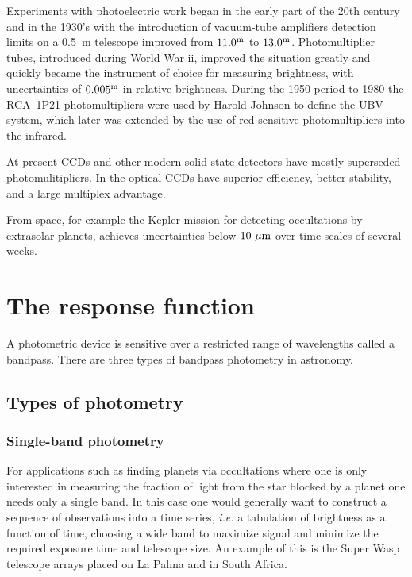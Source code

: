 Experiments with photoelectric work began in the early part of the
20th century and in the 1930's with the introduction of vacuum-tube
amplifiers detection limits on a 0.5~m telescope improved from
$11.0^{\rm m}$ to $13.0^{\rm m}$. Photomultiplier tubes, introduced
during World War {\sc ii}, improved the situation greatly and quickly
became the instrument of choice for measuring brightness, with
uncertainties of $0.005^{\rm m}$ in relative brightness. During the
1950 period to 1980 the RCA~1P21 photomultipliers were used by Harold
Johnson to define the UBV system, which later was extended by the use
of red sensitive photomultipliers into the infrared. 

At present CCDs and other modern solid-state detectors have mostly superseded
photomulitipliers. In the optical CCDs have superior efficiency,
better stability, and a large multiplex advantage.

From space, for example the Kepler mission for detecting occultations
by extrasolar planets, achieves uncertainties below $10~\mu{\rm m}$
over time scales of several weeks.

\section{The response function}

A photometric device is sensitive over a restricted range of
wavelengths called a bandpass. There are three types of bandpass
photometry in astronomy.

\subsection{Types of photometry}

\subsubsection{Single-band photometry}
For applications such as finding
planets via occultations where one is only interested in measuring the
fraction of light from the star blocked by a planet one needs only a
single band. In this case one would generally want to construct a
sequence of observations into a time series, {\it i.e.} a tabulation
of brightness as a function of time, choosing a wide band to maximize
signal and minimize the required exposure time and telescope size. An
example of this is the Super Wasp telescope arrays placed on La Palma
and in South Africa.

